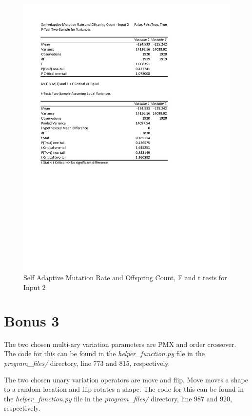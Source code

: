 \documentclass[times]{article}
\begin{document}
	\begin{figure}
		\caption{Self Adaptive Mutation Rate and Offspring Count,  F and t tests for Input 2}
		\label{fig:saMutOffspring2}
		\includegraphics[width=\textwidth]{./t_test/S-A2Bonus2}
	\end{figure}

	\section{Bonus 3}
	The two chosen multi-ary variation parameters are PMX and order crossover. The code for this can be found in the \textit{helper\_function.py} file in the \textit{program\_files/} directory, line 773 and 815, respectively.

	The two chosen unary variation operators are move and flip. Move moves a shape to a random location and flip rotates a shape. The code for this can be found in the \textit{helper\_function.py} file in the \textit{program\_files/} directory, line 987 and 920, respectively.
\end{document}
